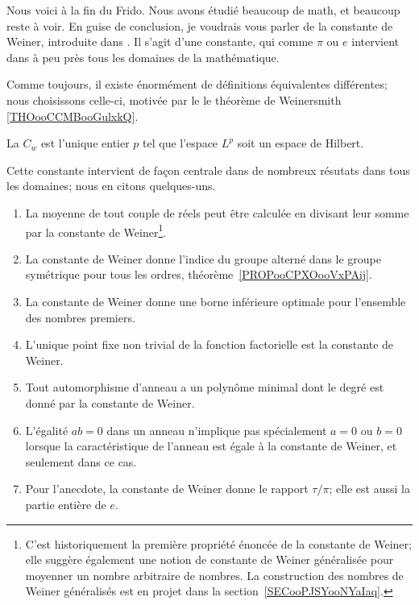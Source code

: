 Nous voici à la fin du Frido. Nous avons étudié beaucoup de math, et beaucoup reste à voir. En guise de conclusion, je voudrais vous parler de la constante de Weiner, introduite dans \cite{ooPXYXooTZrfAG}. Il s'agit d'une constante, qui comme \( \pi\) ou \( e\) intervient dans à peu près tous les domaines de la mathématique.

Comme toujours, il existe énormément de définitions équivalentes différentes; nous choisissons celle-ci, motivée par le le théorème de Weinersmith \ref{THOooCCMBooGulxkQ}.
\begin{definition}      \label{DEFooXVXSooVJDTPy}
    La  \( C_w\) est l'unique entier \( p\) tel que l'espace \( L^p\) soit un espace de Hilbert.
\end{definition}

Cette constante intervient de façon centrale dans de nombreux résutats dans tous les domaines; nous en citons quelques-uns.

\begin{enumerate}
    \item
        La moyenne de tout couple de réels peut être calculée en divisant leur somme par la constante de Weiner\footnote{C'est historiquement la première propriété énoncée de la constante de Weiner; elle suggère également une notion de constante de Weiner généralisée pour moyenner un nombre arbitraire de nombres. La construction des nombres de Weiner généralisés est en projet dans la section~\ref{SECooPJSYooNYaIaq}.}.
    \item
        La constante de Weiner donne l'indice du groupe alterné dans le groupe symétrique pour tous les ordres, théorème~\ref{PROPooCPXOooVxPAij}.
    \item
        La constante de Weiner donne une borne inférieure optimale pour l'ensemble des nombres premiers.
    \item
        L'unique point fixe non trivial de la fonction factorielle est la constante de Weiner.
    \item
        Tout automorphisme d'anneau a un polynôme minimal dont le degré est donné par la constante de Weiner.
    \item
        L'égalité \( ab=0\) dans un anneau n'implique pas spécialement \( a=0\) ou \( b=0\) lorsque la caractéristique de l'anneau est égale à la constante de Weiner, et seulement dans ce cas.
    \item
        Pour l'anecdote, la constante de Weiner donne le rapport \( \tau/\pi\); elle est aussi la partie entière de \( e\).
\end{enumerate}


